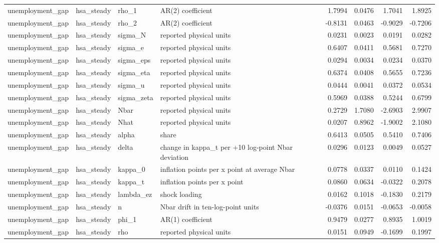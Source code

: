 \begin{tabular}{llllrrrr}
unemployment\_gap & hsa\_steady & rho\_1 & AR(2) coefficient & 1.7994 & 0.0476 & 1.7041 & 1.8925 \\
unemployment\_gap & hsa\_steady & rho\_2 & AR(2) coefficient & -0.8131 & 0.0463 & -0.9029 & -0.7206 \\
unemployment\_gap & hsa\_steady & sigma\_N & reported physical units & 0.0231 & 0.0023 & 0.0191 & 0.0282 \\
unemployment\_gap & hsa\_steady & sigma\_e & reported physical units & 0.6407 & 0.0411 & 0.5681 & 0.7270 \\
unemployment\_gap & hsa\_steady & sigma\_eps & reported physical units & 0.0294 & 0.0034 & 0.0234 & 0.0370 \\
unemployment\_gap & hsa\_steady & sigma\_eta & reported physical units & 0.6374 & 0.0408 & 0.5655 & 0.7236 \\
unemployment\_gap & hsa\_steady & sigma\_u & reported physical units & 0.0444 & 0.0041 & 0.0372 & 0.0534 \\
unemployment\_gap & hsa\_steady & sigma\_zeta & reported physical units & 0.5969 & 0.0388 & 0.5244 & 0.6799 \\
unemployment\_gap & hsa\_steady & Nbar & reported physical units & 0.2729 & 1.7080 & -2.6903 & 2.9907 \\
unemployment\_gap & hsa\_steady & Nhat & reported physical units & 0.0207 & 0.8962 & -1.9002 & 2.1080 \\
unemployment\_gap & hsa\_steady & alpha & share & 0.6413 & 0.0505 & 0.5410 & 0.7406 \\
unemployment\_gap & hsa\_steady & delta & change in kappa\_t per +10 log-point Nbar deviation & 0.0296 & 0.0123 & 0.0049 & 0.0527 \\
unemployment\_gap & hsa\_steady & kappa\_0 & inflation points per x point at average Nbar & 0.0778 & 0.0337 & 0.0110 & 0.1424 \\
unemployment\_gap & hsa\_steady & kappa\_t & inflation points per x point & 0.0860 & 0.0634 & -0.0322 & 0.2078 \\
unemployment\_gap & hsa\_steady & lambda\_ez & shock loading & 0.0162 & 0.1018 & -0.1830 & 0.2179 \\
unemployment\_gap & hsa\_steady & n & Nbar drift in ten-log-point units & -0.0376 & 0.0151 & -0.0653 & -0.0058 \\
unemployment\_gap & hsa\_steady & phi\_1 & AR(1) coefficient & 0.9479 & 0.0277 & 0.8935 & 1.0019 \\
unemployment\_gap & hsa\_steady & rho & reported physical units & 0.0151 & 0.0949 & -0.1699 & 0.1997 \\

\end{tabular}
